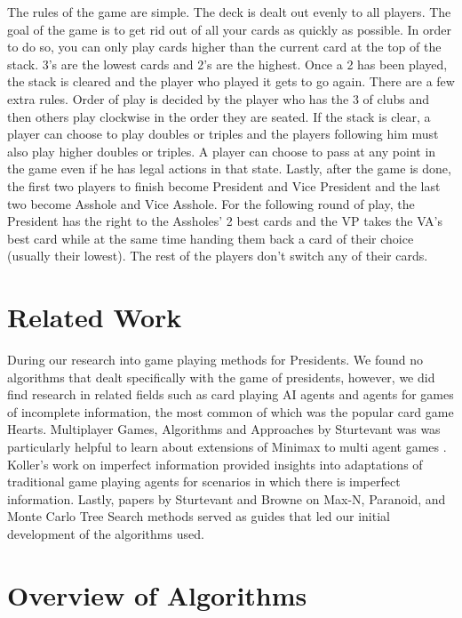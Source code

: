 \documentclass[11pt]{article}
\begin{document}
The rules of the game are simple. The deck is dealt out evenly to all players. The goal of the game is to get rid out of all your cards as quickly as possible. In order to do so, you can only play cards higher than the current card at the top of the stack. 3's are the lowest cards and 2's are the highest. Once a 2 has been played, the stack is cleared and the player who played it gets to go again. There are a few extra rules. Order of play is decided by the player who has the 3 of clubs and then others play clockwise in the order they are seated. If the stack is clear, a player can choose to play doubles or triples and the players following him must also play higher doubles or triples. A player can choose to pass at any point in the game even if he has legal actions in that state. Lastly, after the game is done, the first two players to finish become President and Vice President and the last two become Asshole and Vice Asshole. For the following round of play, the President has the right to the Assholes' 2 best cards and the VP takes the VA's best card while at the same time handing them back a card of their choice (usually their lowest). The rest of the players don't switch any of their cards.

\section{Related Work}

During our research into game playing methods for Presidents. We found no algorithms that dealt specifically with the game of presidents, however, we did find research in related fields such as card playing AI agents and agents for games of incomplete information, the most common of which was the popular card game Hearts.  Multiplayer Games, Algorithms and Approaches by Sturtevant was was particularly helpful to learn about extensions of Minimax to multi agent games \cite{sturtevant03b}. Koller's work on imperfect information provided insights into adaptations of traditional game playing agents for scenarios in which there is imperfect information\cite{pfeffer95}. Lastly, papers by Sturtevant and Browne on Max-N, Paranoid, and Monte Carlo Tree Search methods served as guides that led our initial development of the algorithms used\cite{sturtevant03a, browne12}.



\section{Overview of Algorithms}
\end{document}
